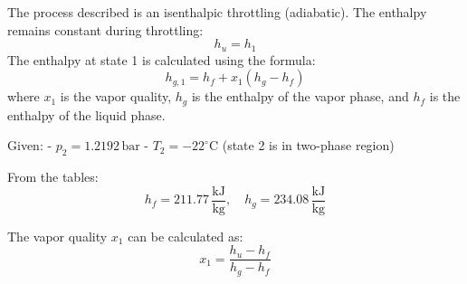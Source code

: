 The process described is an isenthalpic throttling (adiabatic). The enthalpy remains constant during throttling:  
\[
h_u = h_1
\]  
The enthalpy at state 1 is calculated using the formula:  
\[
h_{g,1} = h_f + x_1 (h_g - h_f)
\]  
where \( x_1 \) is the vapor quality, \( h_g \) is the enthalpy of the vapor phase, and \( h_f \) is the enthalpy of the liquid phase.  

Given:  
- \( p_2 = 1.2192 \, \text{bar} \)  
- \( T_2 = -22^\circ\text{C} \) (state 2 is in two-phase region)  

From the tables:  
\[
h_f = 211.77 \, \frac{\text{kJ}}{\text{kg}}, \quad h_g = 234.08 \, \frac{\text{kJ}}{\text{kg}}
\]  

The vapor quality \( x_1 \) can be calculated as:  
\[
x_1 = \frac{h_u - h_f}{h_g - h_f}
\]